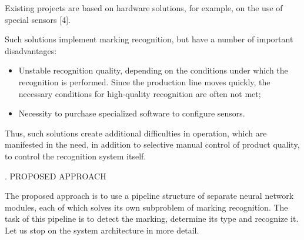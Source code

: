 \documentclass[a4paper, twocolumn]{article}
\begin{document}
Existing projects are based on hardware solutions, for
example, on the use of special sensors [4].
\par
Such solutions implement marking recognition, but
have a number of important disadvantages:

\begin{itemize}
    \item Unstable recognition quality, depending on the conditions under which the recognition is performed.
Since the production line moves quickly, the necessary conditions for high-quality recognition are
often not met;
    \item Necessity to purchase specialized software to configure sensors.
\end{itemize} 

Thus, such solutions create additional difficulties in
operation, which are manifested in the need, in addition
to selective manual control of product quality, to control
the recognition system itself.

\begin{center}
    . PROPOSED APPROACH
\end{center}

The proposed approach is to use a pipeline structure of
separate neural network modules, each of which solves
its own subproblem of marking recognition.
The task of this pipeline is to detect the marking,
determine its type and recognize it.
Let us stop on the system architecture in more detail.
\end{document}

